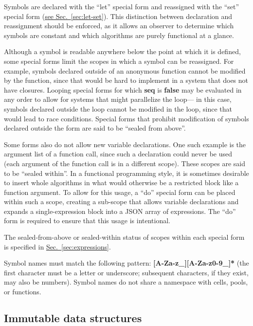 \documentclass{article}
\newcommand{\PFAc}{\ttfamily\bfseries}
\theoremstyle{definition}
\begin{document}
Symbols are declared with the ``let'' special form and reassigned with the ``set'' special form (\hyperlink{hsec:let-set}{see Sec.~\ref{sec:let-set}}).  This distinction between declaration and reassignment should be enforced, as it allows an observer to determine which symbols are constant and which algorithms are purely functional at a glance.

Although a symbol is readable anywhere below the point at which it is defined, some special forms limit the scopes in which a symbol can be reassigned.  For example, symbols declared outside of an anonymous function cannot be modified by the function, since that would be hard to implement in a system that does not have closures.  Looping special forms for which {\PFAc seq} is {\PFAc false} may be evaluated in any order to allow for systems that might parallelize the loop--- in this case, symbols declared outside the loop cannot be modified in the loop, since that would lead to race conditions.  Special forms that prohibit modification of symbols declared outside the form are said to be ``sealed from above''.

Some forms also do not allow new variable declarations.  One such example is the argument list of a function call, since such a declaration could never be used (each argument of the function call is in a different scope).  These scopes are said to be ``sealed within''.  In a functional programming style, it is sometimes desirable to insert whole algorithms in what would otherwise be a restricted block like a function argument.  To allow for this usage, a ``do'' special form can be placed within such a scope, creating a sub-scope that allows variable declarations and expands a single-expression block into a JSON array of expressions.  The ``do'' form is required to ensure that this usage is intentional.

The sealed-from-above or sealed-within status of scopes within each special form is specified in \hyperlink{hsec:expressions}{Sec.~\ref{sec:expressions}}.

Symbol names must match the following pattern: {\PFAc [A-Za-z\_][A-Za-z0-9\_]*} (the first character must be a letter or underscore; subsequent characters, if they exist, may also be numbers).  Symbol names do not share a namespace with cells, pools, or functions.

\hypertarget{hsec:immutable}{}
\subsection{Immutable data structures}
\label{sec:immutable}
\end{document}
